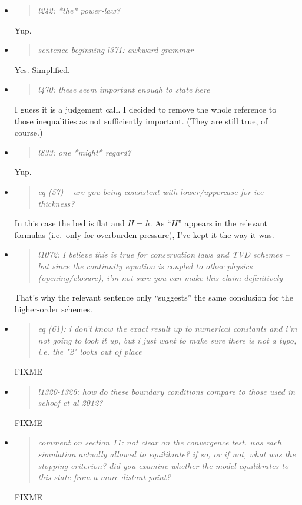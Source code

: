 \documentclass[11pt,reqno]{amsart}
\newcommand{\reply}[2]{
\medskip\medskip
\item  \begin{quote}
\emph{#1}
\end{quote}

\medskip
\noindent #2}
\begin{document}
\begin{itemize}
\reply{l242: *the* power-law?}{Yup.}

\reply{sentence beginning l371: awkward grammar}{Yes.  Simplified.}

\reply{l470: these seem important enough to state here}{I guess it is a judgement call.  I decided to remove the whole reference to those inequalities as not sufficiently important.  (They are still true, of course.)}

\reply{l833: one *might* regard?}{Yup.}

\reply{eq (57) -- are you being consistent with lower/uppercase for ice thickness?}{In this case the bed is flat and $H=h$.  As ``$H$'' appears in the relevant formulas (i.e.~only for overburden pressure), I've kept it the way it was.}

\reply{l1072: I believe this is true for conservation laws and TVD schemes -- but since the continuity equation is coupled to other physics (opening/closure), i'm not sure you can make this claim definitively}{That's why the relevant sentence only ``suggests'' the same conclusion for the higher-order schemes.}

\reply{eq (61): i don't know the exact result up to numerical constants and i'm not going to look it up, but i just want to make sure there is not a typo, i.e. the "2" looks out of place}{FIXME}

\reply{l1320-1326: how do these boundary conditions compare to those used in schoof et al 2012?}{FIXME}

\reply{comment on section 11: not clear on the convergence test. was each simulation actually allowed to equilibrate? if so, or if not, what was the stopping criterion? did you examine whether the model equilibrates to this state from a more distant point?}{FIXME}

\end{itemize}
\end{document}
